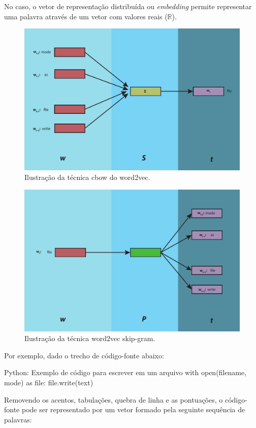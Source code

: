 No caso, o vetor de representação distribuída ou \textit{embedding} permite representar uma palavra através de um vetor com valores reais ($\mathbb{R}$). 

\begin{figure}[H]
\centering
\includegraphics[width=.8\textwidth]{figuras/cap-trabalhos-relacionados/word2vec-cbow.pdf}
\caption{Ilustração da técnica cbow do word2vec.} 
\label{fig:word2vec-cbow}
\end{figure}

\begin{figure}[H]
\centering
\includegraphics[width=.8\textwidth]{figuras/cap-trabalhos-relacionados/word2vec-skip-gram.pdf}
\caption{Ilustração da técnica word2vec skip-gram.} 
\label{fig:word2vec-skip-gram}
\end{figure}

Por exemplo, dado o trecho de código-fonte abaixo:

\begin{mypython}{Python: Exemplo de código para escrever em um arquivo}
with open(filename, mode) as file:
    file.write(text)
\end{mypython}

Removendo os acentos, tabulações, quebra de linha e as pontuações, o código-fonte pode ser representado por um vetor formado pela seguinte sequência de palavras:

